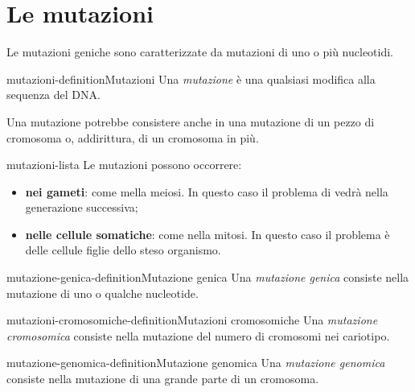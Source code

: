 \documentclass[preview]{standalone}
\begin{document}
\genpage

\section{Le mutazioni}

\begin{plainhtml}
    Le mutazioni geniche sono caratterizzate da mutazioni di uno o più nucleotidi.
\end{plainhtml}

\begin{snippetdefinition}{mutazioni-definition}{Mutazioni}
    Una \textit{mutazione} è una qualsiasi modifica alla sequenza del DNA.
\end{snippetdefinition}

\begin{plainhtml}
    Una mutazione potrebbe consistere anche in una mutazione di un pezzo di cromosoma o, addirittura,
    di un cromosoma in più.
\end{plainhtml}

\begin{snippet}{mutazioni-lista}
    Le mutazioni possono occorrere:
    \begin{itemize}
        \item \textbf{nei gameti}: come mella meiosi.
            In questo caso il problema di vedrà nella generazione successiva;
        \item \textbf{nelle cellule somatiche}: come nella mitosi.
            In questo caso il problema è delle cellule figlie dello steso organismo.
    \end{itemize}
\end{snippet}

\begin{snippetdefinition}{mutazione-genica-definition}{Mutazione genica}
    Una \textit{mutazione genica} consiste nella mutazione
    di uno o qualche nucleotide.
\end{snippetdefinition}

\begin{snippetdefinition}{mutazioni-cromosomiche-definition}{Mutazioni cromosomiche}
    Una \textit{mutazione cromosomica} consiste nella mutazione
    del numero di cromosomi nei cariotipo.
\end{snippetdefinition}

\begin{snippetdefinition}{mutazione-genomica-definition}{Mutazione genomica}
    Una \textit{mutazione genomica} consiste nella mutazione
    di una grande parte di un cromosoma.
\end{snippetdefinition}
\end{document}
